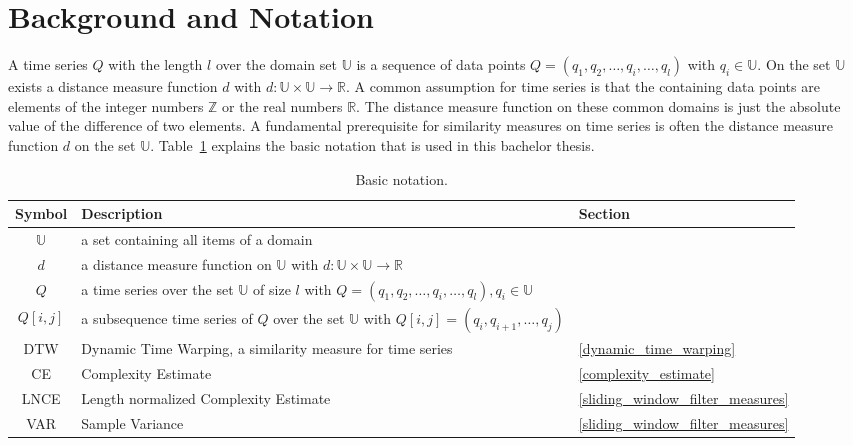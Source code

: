 \section{Background and Notation} \label{background_and_notation}
A time series $Q$ with the length $l$ over the domain set $\mathbb{U}$ is a sequence of data points
$Q = (q_1, q_2, \dots, q_i, \dots, q_l)$ with $q_i \in \mathbb{U}$. On the set $\mathbb{U}$ exists a distance measure
function $d$ with $d: \mathbb{U} \times \mathbb{U} \to \mathbb{R}$. A common assumption for time series is that the
containing data points are elements of the integer numbers $\mathbb{Z}$ or the real numbers $\mathbb{R}$. The distance
measure function on these common domains is just the absolute value of the difference of two elements. A fundamental
prerequisite for similarity measures on time series is often the distance measure function $d$ on the set
$\mathbb{U}$. Table~\ref{tab:notation} explains the basic notation that is used in this bachelor thesis.

\begin{table}
    \begin{center}
        \begin{tabularx}{\textwidth}{c X l}
            \hline
            \textbf{Symbol} \qquad & \textbf{Description} & \qquad \textbf{Section}\\
            \hline
            $\mathbb{U}$ & a set containing all items of a domain & \qquad\\
            $d$ & a distance measure function on $\mathbb{U}$ with $d: \mathbb{U} \times \mathbb{U} \to \mathbb{R}$
                & \qquad\\
            $Q$ & a time series over the set $\mathbb{U}$ of size $l$ with
                $Q = (q_1, q_2, \dots, q_i, \dots, q_l), q_i \in \mathbb{U}$ & \qquad\\
            $Q[i,j]$ & a subsequence time series of $Q$ over the set $\mathbb{U}$ with
                $Q[i,j] = (q_i, q_{i+1}, \dots, q_{j})$ & \qquad\\
            DTW & Dynamic Time Warping, a similarity measure for time series & \qquad \ref{dynamic_time_warping}\\
            CE & Complexity Estimate & \qquad \ref{complexity_estimate}\\
            LNCE & Length normalized Complexity Estimate & \qquad \ref{sliding_window_filter_measures}\\
            VAR & Sample Variance & \qquad \ref{sliding_window_filter_measures}\\
            \hline
        \end{tabularx}
    \end{center}
    \caption{Basic notation.}
	\label{tab:notation}
\end{table}





